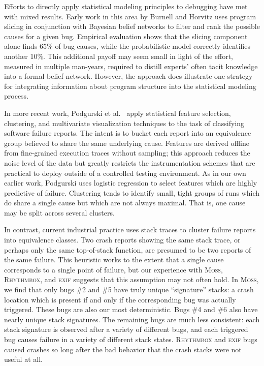 \documentclass[draft]{sig-alternate}
\newcommand{\moss}{\textsc{Moss}\xspace}
\newcommand{\rhythmbox}{\textsc{Rhythmbox}\xspace}
\newcommand{\exif}{\textsc{exif}\xspace}
\begin{document}
Efforts to directly apply statistical modeling principles to debugging
have met with mixed results.  Early work in this area by Burnell and
Horvitz \cite{Burnell:1995:SCM} uses program slicing in conjunction
with Bayesian belief networks to filter and rank the possible causes
for a given bug.  Empirical evaluation shows that the slicing component
alone finds 65\% of bug causes, while the probabilistic model
correctly identifies another 10\%.  This additional payoff may seem
small in light of the effort, measured in multiple
man-years, required to distill experts' often tacit knowledge into a
formal belief network.  However, the approach does illustrate one
strategy for integrating information about program structure into the
statistical modeling process.

In more recent work, Podgurski et al.\ \cite{ICSE`03*465} apply
statistical feature selection, clustering, and multivariate
visualization techniques to the task of classifying software failure
reports.  The intent is to bucket each report into an equivalence
group believed to share the same underlying cause.  Features are
derived offline from fine-grained execution traces without sampling;
this approach reduces the noise level of the data but greatly restricts the
instrumentation schemes that are practical to deploy outside of a
controlled testing environment.  As in our own earlier work, Podgurski
uses logistic regression to select features which are highly
predictive of failure.  
Clustering tends to identify small, tight groups of runs which do
share a single cause but which are not always maximal.  That is, one
cause may be split across several clusters.

In contrast, current
industrial practice uses stack traces to cluster failure reports into
equivalence classes.  Two crash reports showing the same stack trace,
or perhaps only the same top-of-stack function, are presumed to be two
reports of the same failure.  This heuristic works to the extent that a single
cause corresponds to a single point of failure, but our experience
with \moss, \rhythmbox, and \exif suggests that this assumption may not often hold.  In \moss,
we find that only bugs \#2 and \#5 have truly unique ``signature'' stacks: a
crash location which is present if and only if the corresponding bug
was actually triggered.  These bugs are also our most deterministic.
Bugs \#4 and \#6 also have nearly unique stack signatures.
The remaining bugs are much less consistent: each stack signature is
observed after a variety of different bugs, and each triggered bug
causes failure in a variety of different stack states.  \rhythmbox and \exif
bugs caused crashes so long after the bad behavior that the crash stacks
were not useful at all.
\end{document}
